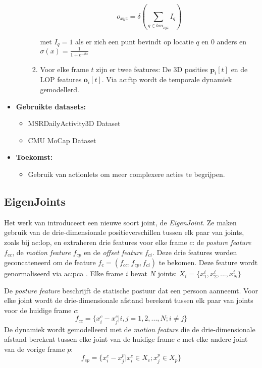 \begin{itemize}
\begin{enumerate}
\begin{enumerate}
			$$o_{xyz} = \delta(\sum_{q \in bin_{xyz}} I_q)$$
			
			met $I_q = 1$ als er zich een punt bevindt op locatie $q$ en 0 anders en $\sigma(x) = \frac{1}{1 + e^{-\beta x}}$ 
			
			\item Voor elke frame $t$ zijn er twee features: De 3D posities $\textbf{p}_i[t]$ en de LOP features $\textbf{o}_i[t]$. Via \gls{ac:ftp} wordt de temporale dynamiek gemodellerd.
		\end{enumerate} 
	\end{enumerate}
	\item \textbf{Gebruikte datasets:}
	\begin{itemize}
		\item MSRDailyActivity3D Dataset
		\item CMU MoCap Dataset
	\end{itemize}
	\item \textbf{Toekomst:}
	\begin{itemize}
		\item Gebruik van actionlets om meer complexere acties te begrijpen.
	\end{itemize}
\end{itemize}


\subsection{EigenJoints}
Het werk van \cite{Yang2012} introduceert een nieuwe soort joint, de \textit{EigenJoint}. Ze maken gebruik van de drie-dimensionale positieverschillen tussen elk paar van joints, zoals bij \gls{ac:lop}, en extraheren drie features voor elke frame $c$: de \textit{posture feature} $f_{cc}$, de \textit{motion feature} $f_{cp}$ en de \textit{offset feature} $f_{ci}$. Deze drie features worden geconcateneerd om de feature $f_c = (f_{cc}, f_{cp}, f_{ci})$ te bekomen. Deze feature wordt genormaliseerd via \gls{ac:pca} . Elke frame $i$ bevat $N$ joints: $X_i = \{x_1^i, x_2^i, ..., x_N^i \}$

De \textit{posture feature} beschrijft de statische postuur dat een persoon aanneemt. Voor elke joint wordt de drie-dimensionale afstand berekent tussen elk paar van joints voor de huidige frame $c$:
$$f_{cc} = \{x_i^c - x_j^c | i , j = 1, 2, ..., N; i \neq j\}$$
De dynamiek wordt gemodelleerd met de \textit{motion feature} die de drie-dimensionale afstand berekent tussen elke joint van de huidige frame $c$ met elke andere joint van de vorige frame $p$: 
$$f_{cp} = \{x_i^c - x_j^p | x_i^c \in X_c ; x_j^p \in X_p \}$$

